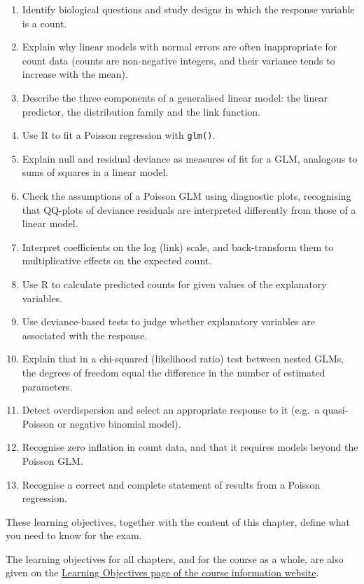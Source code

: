 \documentclass[
  letterpaper,
  8pt,
  a4paper]{book}
\providecommand{\tightlist}{%
  \setlength{\itemsep}{0pt}\setlength{\parskip}{0pt}}
\begin{document}
\begin{tcolorbox}
\begin{enumerate}
\def\labelenumi{\arabic{enumi}.}
\tightlist
\item
  Identify biological questions and study designs in which the response
  variable is a count.
\item
  Explain why linear models with normal errors are often inappropriate
  for count data (counts are non-negative integers, and their variance
  tends to increase with the mean).
\item
  Describe the three components of a generalised linear model: the
  linear predictor, the distribution family and the link function.
\item
  Use R to fit a Poisson regression with \texttt{glm()}.
\item
  Explain null and residual deviance as measures of fit for a GLM,
  analogous to sums of squares in a linear model.
\item
  Check the assumptions of a Poisson GLM using diagnostic plots,
  recognising that QQ-plots of deviance residuals are interpreted
  differently from those of a linear model.
\item
  Interpret coefficients on the log (link) scale, and back-transform
  them to multiplicative effects on the expected count.
\item
  Use R to calculate predicted counts for given values of the
  explanatory variables.
\item
  Use deviance-based tests to judge whether explanatory variables are
  associated with the response.
\item
  Explain that in a chi-squared (likelihood ratio) test between nested
  GLMs, the degrees of freedom equal the difference in the number of
  estimated parameters.
\item
  Detect overdispersion and select an appropriate response to it (e.g.~a
  quasi-Poisson or negative binomial model).
\item
  Recognise zero inflation in count data, and that it requires models
  beyond the Poisson GLM.
\item
  Recognise a correct and complete statement of results from a Poisson
  regression.
\end{enumerate}

These learning objectives, together with the content of this chapter,
define what you need to know for the exam.

The learning objectives for all chapters, and for the course as a whole,
are also given on the
\href{https://opetchey.github.io/BIO144_Course_Information/3.1-learning-objectives.html}{Learning
Objectives page of the course information website}.

\end{tcolorbox}
\end{document}
